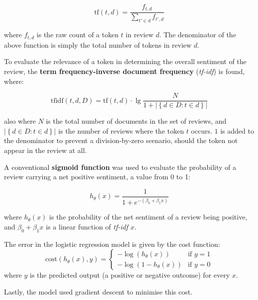 \documentclass[12pt, bibliography=totocnumbered, a4paper]{scrartcl}
\def\bf#1{\textbf{#1}}
\def\it#1{\textit{#1}}
\begin{document}
\begin{equation}
	\text{tf}(t,d) = \frac{f_{t,d}}{\sum_{t'\in d}^{}f_{t',d}}
	\label{eq:tf}
\end{equation}

where \(f_{t,d}\) is the raw count of a token \(t\) in review \(d\). The denominator of the above
function is simply the total number of tokens in review \(d\).

To evaluate the relevance of a token in determining the overall sentiment of the
review, the \bf{term frequency-inverse document frequency} (\it{tf-idf}) is found, where:

\begin{equation}
	\text{tfidf}(t,d,D) = \text{tf}(t,d)\cdot\lg\frac{N}{1+\left|\left\{d\in D : t\in d\right\}\right|}
	\label{eq:tfidf}
\end{equation}

also where \(N\) is the total number of documents in the set of reviews, and
\(\left|\left\{d\in D : t\in d\right\}\right|\) is the number of reviews where
the token \(t\) occurs. \(1\) is added to the denominator to prevent a
division-by-zero scenario, should the token not appear in the review at all.

A conventional \bf{sigmoid function} was used to evaluate the probability
of a review carrying a net positive sentiment, a value from 0 to 1:

\begin{equation}
	h_\theta(x) = \frac{1}{1+e^{-{\left(\beta_0+\beta_1x\right)}}}
	\label{eq:sigmoid}
\end{equation}

where \(h_\theta(x)\) is the probability of the net sentiment of a review being positive, and
\(\beta_0+\beta_1x\) is a linear function of \it{tf-idf} \(x\).

The error in the logistic regression model is given by the cost function:
\begin{equation}
	\text{cost}\left(h_\theta\left(x\right),y\right) = \begin{cases}
		-\log\left(h_\theta\left(x\right)\right)   & \text{if } y = 1 \\
		-\log\left(1-h_\theta\left(x\right)\right) & \text{if } y = 0
	\end{cases}
\end{equation}
where \(y\) is the predicted output (a positive or negative outcome) for every \(x\).

Lastly, the model used gradient descent to minimise this cost.
\end{document}
